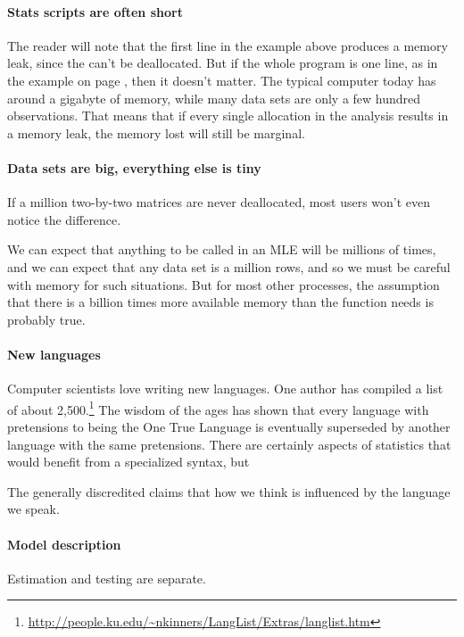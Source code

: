 {\paragraph{Stats scripts are often short}
The reader will note that the first line in the example above
produces a memory leak, since the  can't be
deallocated. But if the whole program is one line, as in the example on
page \pageref{oneliner}, then it doesn't matter. The typical computer
today has around a gigabyte of memory, while many data sets are only a few
hundred observations. That means that if every single allocation in the
analysis results in a memory leak, the memory lost will still be marginal.

\paragraph{Data sets are big, everything else is tiny}
If a million two-by-two matrices are never deallocated, most
users won't even notice the difference.

We can expect that anything to be called in an MLE will be millions of
times, and we can expect that any data set is a million rows, and so we
must be careful with memory for such situations. But for most other
processes, the assumption that there is a billion times more available
memory than the function needs is probably true.


\paragraph{New languages} Computer scientists love writing new
languages.  One author has compiled a list of about
2,500.\footnote{\url{http://people.ku.edu/~nkinners/LangList/Extras/langlist.htm}}
The wisdom of the ages has shown that every language with pretensions
to being the One True Language is eventually superseded by another
language with the same pretensions. There are certainly aspects of
statistics that would benefit from a specialized syntax, but 


The
generally discredited  claims that how we
think is influenced by the language we speak. 

\paragraph{Model description} Estimation and testing are separate.

}



